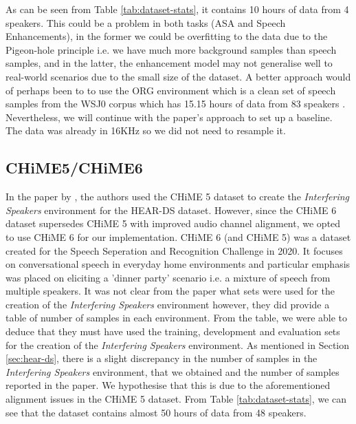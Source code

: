 \documentclass[logo,bsc,singlespacing,parskip,online]{infthesis}
\begin{document}
As can be seen from Table \ref{tab:dataset-stats}, it contains 10 hours of data from 4 speakers. This could be a problem in both tasks (ASA and Speech Enhancements), in the former
we could be overfitting to the data due to the Pigeon-hole principle i.e. we have much more background samples than speech samples, 
and in the latter, the enhancement model may not generalise well to real-world scenarios due to the small size of the dataset. 
A better approach would of perhaps been to to use the ORG environment which is a clean set of speech samples from the WSJ0 corpus 
which has 15.15 hours of data from 83 speakers \cite{barker_third_2015}.
Nevertheless, we will continue with the paper's approach to set up a baseline. The data was already in 16KHz so we did not need to 
resample it. 

\subsection{CHiME5/CHiME6}
In the paper by \citet{Huwel2020HearDS}, the authors used the CHiME 5 dataset to create the \textit{Interfering Speakers} environment for the HEAR-DS dataset.
However, since the CHiME 6 dataset supersedes CHiME 5 with improved audio channel alignment, we opted to use CHiME 6 for our implementation.
CHiME 6 (and CHiME 5) was a dataset created for the Speech Seperation and Recognition Challenge in 2020. It 
focuses on conversational speech in everyday home environments and particular emphasis was placed on 
eliciting a 'dinner party' scenario i.e. a mixture of speech from multiple speakers. It was not 
clear from the paper what sets were used for the creation of the \textit{Interfering Speakers} environment 
however, they did provide a table of number of samples in each environment. From the table, we 
were able to deduce that they must have used the training, development and evaluation sets for the creation of the \textit{Interfering Speakers} environment.
As mentioned in Section \ref{sec:hear-ds}, there is a slight discrepancy in the number of samples in the \textit{Interfering Speakers} environment, 
that we obtained and the number of samples reported in the paper. We hypothesise that this is due to the aforementioned alignment issues in the CHiME 5 dataset.
From Table \ref{tab:dataset-stats}, we can see that the dataset contains almost 50 hours of data from 48 speakers. 
\end{document}
